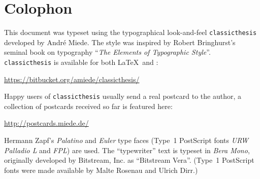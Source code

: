\pagestyle{empty}

\hfill

\vfill


\section*{Colophon}
This document was typeset using the typographical look-and-feel \texttt{classicthesis} developed by Andr\'e Miede. 
The style was inspired by Robert Bringhurst's seminal book on typography ``\emph{The Elements of Typographic Style}''. 
\texttt{classicthesis} is available for both \LaTeX\ and \mLyX: 
\begin{center}
\url{https://bitbucket.org/amiede/classicthesis/}
\end{center}
Happy users of \texttt{classicthesis} usually send a real postcard to the author, a collection of postcards received so far is featured here: 
\begin{center}
\url{http://postcards.miede.de/}
\end{center}
 
\bigskip

\noindent\finalVersionString

Hermann Zapf's \emph{Palatino} and \emph{Euler} type faces (Type~1 PostScript fonts \emph{URW
Palladio L} and \emph{FPL}) are used. The ``typewriter'' text is typeset in \emph{Bera Mono}, 
originally developed by Bitstream, Inc. as ``Bitstream Vera''. (Type~1 PostScript fonts were made 
available by Malte Rosenau and
Ulrich Dirr.)

%
%




